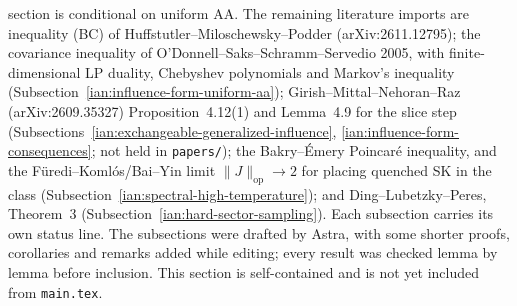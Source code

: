 section is conditional on uniform AA. The remaining literature imports are inequality (BC) of Huffstutler--Miloschewsky--Podder (arXiv:2611.12795); the covariance inequality of O'Donnell--Saks--Schramm--Servedio 2005, with finite-dimensional LP duality, Chebyshev polynomials and Markov's inequality (Subsection~\ref{ian:influence-form-uniform-aa}); Girish--Mittal--Nehoran--Raz (arXiv:2609.35327) Proposition~4.12(1) and Lemma~4.9 for the slice step (Subsections~\ref{ian:exchangeable-generalized-influence}, \ref{ian:influence-form-consequences}; not held in \texttt{papers/}); the Bakry--\'Emery Poincar\'e inequality, and the F\"uredi--Koml\'os/Bai--Yin limit \(\|J\|_{\mathrm{op}}\to2\) for placing quenched SK in the class (Subsection~\ref{ian:spectral-high-temperature}); and Ding--Lubetzky--Peres, Theorem~3 (Subsection~\ref{ian:hard-sector-sampling}). Each subsection carries its own status line. The subsections were drafted by Astra, with some shorter proofs, corollaries and remarks added while editing; every result was checked lemma by lemma before inclusion. This section is self-contained and is not yet included from \texttt{main.tex}.




































